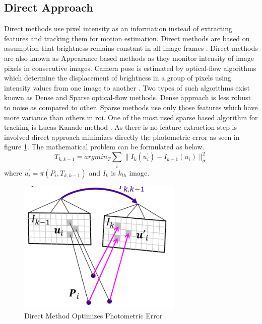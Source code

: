 \subsection{Direct Approach}
\label{direct}
Direct methods use pixel intensity as an information instead of extracting features and tracking them for motion estimation. Direct methods are based on assumption that brightness remains constant in all image frames \cite{Irani-et-al-1999}. Direct methods are also known as Appearance based methods as they monitor intensity of image pixels in consecutive images. Camera pose is estimated by optical-flow algorithms which determine the displacement of brightness in a group of pixels using intensity values from one image to another \cite{Aqel-et-al-2016}. Two types of such algorithms exist known as Dense and Sparse optical-flow methods. Dense approach is less robust to noise as compared to other. Sparse methods use only those features which have more variance than others in \acrshort{roi}. One of the most used sparse based algorithm for tracking is Lucas-Kanade method \cite{Lucas81}. As there is no feature extraction step is involved direct approach minimizes directly the photometric error as seen in figure \ref{fig:direct}. The mathematical problem can be formulated as below. 
\begin{equation*}
	T_{k,k-1} = arg min_{T} \sum_{i} \| I_{k}(u^{'}_{i})- I_{k-1}(u_{i})\|^{2}_{\sigma}
\end{equation*}
where $u^{'}_{i} = \pi (P_{i},T_{k,k-1})$ and $I_{k} $ is  $k_{th}$ image.
\newline
\begin{figure}[h]
	\centering
	\includegraphics[width=0.7\textwidth]{direct}
	\caption{Direct Method Optimizes Photometric Error \cite{lecture}}
	\label{fig:direct}
\end{figure}
